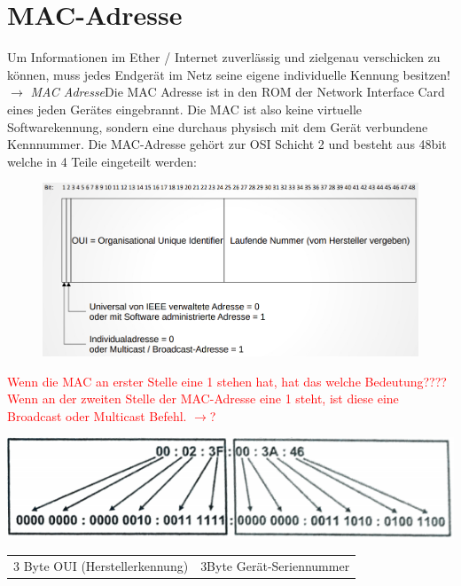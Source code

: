 \documentclass[12pt,a4paper]{article}
\begin{document}
	\section{MAC-Adresse}
		Um Informationen im Ether / Internet zuverlässig und zielgenau verschicken zu können, muss jedes Endgerät im Netz seine eigene individuelle Kennung besitzen!\newline $\longrightarrow$ \emph{MAC Adresse}\newline Die MAC Adresse ist in den ROM der Network Interface Card eines jeden Gerätes eingebrannt. Die MAC ist also keine virtuelle Softwarekennung, sondern eine durchaus physisch mit dem Gerät verbundene Kennnummer. Die MAC-Adresse gehört zur OSI Schicht 2 und besteht aus 48bit welche in 4 Teile eingeteilt werden:
		\begin{center}
			\begin{figure}[!h]
				\includegraphics[width=\textwidth]{Bilder/MAC-Adresse.PNG}
			\end{figure}
		\end{center}
		\textcolor{red}{Wenn die MAC an erster Stelle eine 1 stehen hat, hat das welche Bedeutung???? Wenn an der zweiten Stelle der MAC-Adresse eine 1 steht, ist diese eine Broadcast oder Multicast Befehl. $\rightarrow$?}
		\begin{center}
			\includegraphics[scale=1]{Bilder/MAC.png}
			\begin{tabularx}{14cm}{XX}
				3 Byte OUI (Herstellerkennung)&3Byte Gerät-Seriennummer
			\end{tabularx}
		\end{center}
\end{document}
